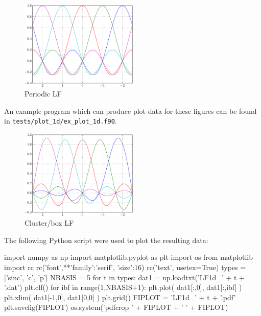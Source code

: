 \begin{figure}[h]
{\centering
\includegraphics[width=0.5\textwidth]{../../tests/plot_1d/LF1d_p.pdf}
\par}
\caption{Periodic LF}\label{fig:LF1d_p_5}
\end{figure}

An example program which can produce plot data for these figures can be
found in \texttt{tests/plot\_1d/ex\_plot\_1d.f90}.

\begin{figure}[h]
{\centering
\includegraphics[width=0.5\textwidth]{../../tests/plot_1d/LF1d_c.pdf}
\par}
\caption{Cluster/box LF}\label{fig:LF1d_c_5}
\end{figure}

The following Python script were used to plot the resulting data:
\begin{pythoncode}
import numpy as np
import matplotlib.pyplot as plt
import os
from matplotlib import rc
rc('font',**{'family':'serif', 'size':16})
rc('text', usetex=True)
types = ['sinc', 'c', 'p']
NBASIS = 5
for t in types:
    dat1 = np.loadtxt('LF1d_' + t + '.dat')
    plt.clf()
    for ibf in range(1,NBASIS+1):
        plt.plot( dat1[:,0], dat1[:,ibf] )
    plt.xlim( dat1[-1,0], dat1[0,0] )
    plt.grid()
    FIPLOT = 'LF1d_' + t + '.pdf'
    plt.savefig(FIPLOT)
    os.system('pdfcrop ' + FIPLOT + ' ' + FIPLOT)
\end{pythoncode}

